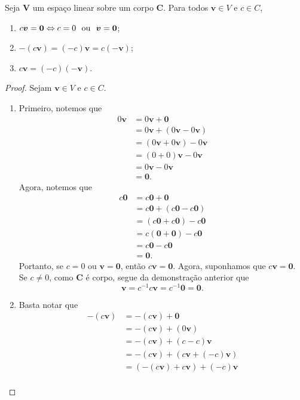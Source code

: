 \begin{prop}
Seja $\bm V$ um espaço linear sobre um corpo $\bm C$. Para todos $\bm v \in V$ e $c \in C$,
	\begin{enumerate}
	\item $c\bm v = \bm 0 \Leftrightarrow c=0 \text{\ \ ou\ \ } \bm v = \bm 0$;
	\item $-(c\bm v) = (-c)\bm v = c(- \bm v)$;
	\item $c\bm v = (-c)(- \bm v)$.
	\end{enumerate}
\end{prop}
\begin{proof} Sejam $\bm v \in V$ e $c \in C$.
	\begin{enumerate}
	\item Primeiro, notemos que
		\begin{align*}
		0 \bm v &= 0 \bm v + \bm 0 \\
			&= 0 \bm v + (0 \bm v - 0 \bm v) \\
			&= (0 \bm v + 0 \bm v) - 0 \bm v \\
			&= (0+0) \bm v - 0 \bm v \\
			&= 0 \bm v - 0 \bm v \\
			&= \bm 0.
		  \end{align*}
Agora, notemos que
		\begin{align*}
		c \bm 0 &= c \bm 0 + \bm 0 \\
			&= c \bm 0 + (c \bm 0 - c \bm 0) \\
			&= (c \bm 0 + c \bm 0) - c \bm 0 \\
			&= c  (\bm 0 + \bm 0) - c \bm 0 \\
			&= c \bm 0 - c \bm 0 \\
			&= \bm 0.
		\end{align*}
Portanto, se $c=0$ ou $\bm v = \bm 0$, então $c\bm v = \bm 0$. Agora, suponhamos que $c\bm v =\bm 0$. Se $c \neq 0$, como $\bm C$ é corpo, segue da demonstração anterior que
		\begin{equation*}
		\bm v = c^{-1}c\bm v = c^{-1} \bm 0 = \bm 0.
		\end{equation*}
	\item Basta notar que
		\begin{align*}
		\bm -(c\bm{v}) &= \bm -(c\bm{v}) + \bm 0 \\
			&= \bm -(c\bm{v}) + (0 \bm v) \\
			&= \bm -(c\bm{v}) + (c-c) \bm v \\
			&= \bm -(c\bm{v}) + (c\bm v + (-c) \bm v) \\
			&= (\bm -(c\bm{v}) + c\bm v) + (-c) \bm v \\

\end{align*}
\end{enumerate}
\end{proof}
